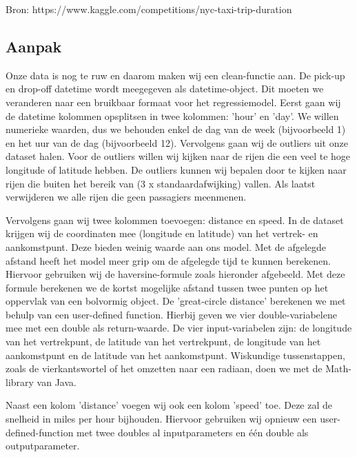 \documentclass[a4paper,12pt,twoside]{report}
\begin{document}
Bron: https://www.kaggle.com/competitions/nyc-taxi-trip-duration

\subsection*{Aanpak}

Onze data is nog te ruw en daarom maken wij een clean-functie aan. De pick-up en drop-off datetime wordt meegegeven als datetime-object. Dit moeten we veranderen naar een bruikbaar formaat voor het regressiemodel. Eerst gaan wij de datetime kolommen opsplitsen in twee kolommen: 'hour' en 'day'. We willen numerieke waarden, dus we behouden enkel de dag van de week (bijvoorbeeld 1) en het uur van de dag (bijvoorbeeld 12). Vervolgens gaan wij de outliers uit onze dataset halen. Voor de outliers willen wij kijken naar de rijen die een veel te hoge longitude of latitude hebben. De outliers kunnen wij bepalen door te kijken naar rijen die buiten het bereik van (3 x standaardafwijking) vallen. Als laatst verwijderen we alle rijen die geen passagiers meenmenen. 

Vervolgens gaan wij twee kolommen toevoegen: distance en speed. In de dataset krijgen wij de coordinaten mee (longitude en latitude) van het vertrek- en aankomstpunt. Deze bieden weinig waarde aan ons model. Met de afgelegde afstand heeft het model meer grip om de afgelegde tijd te kunnen berekenen. Hiervoor gebruiken wij de haversine-formule zoals hieronder afgebeeld. Met deze formule berekenen we de kortst mogelijke afstand tussen twee punten op het oppervlak van een bolvormig object. De 'great-circle distance' berekenen we met behulp van een user-defined function. Hierbij geven we vier double-variabelene mee met een double als return-waarde. De vier input-variabelen zijn: de longitude van het vertrekpunt, de latitude van het vertrekpunt, de longitude van het aankomstpunt en de latitude van het aankomstpunt. Wiskundige tussenstappen, zoals de vierkantswortel of het omzetten naar een radiaan, doen we met de Math-library van Java.

Naast een kolom 'distance' voegen wij ook een kolom 'speed' toe. Deze zal de snelheid in miles per hour bijhouden. Hiervoor gebruiken wij opnieuw een user-defined-function met twee doubles al inputparameters en één double als outputparameter.
\end{document}
